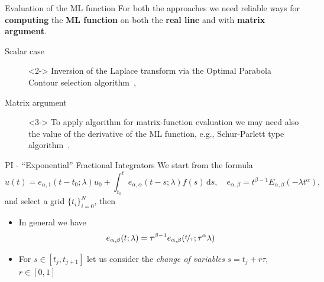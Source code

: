 \documentclass[aspectratio=169,xcolor=dvipsnames]{beamer}
\begin{document}
\begin{frame}{Evaluation of the ML function}
For both the approaches we need reliable ways for \textbf{computing} the \textbf{ML function} on both the \textbf{real line} and with \textbf{matrix argument}.  
\begin{description}
	\item[Scalar case]<2-> Inversion of the Laplace transform via the \alert{Optimal Parabola Contour} selection algorithm~\parencite{Garrappa},
	\item[Matrix argument]<3-> To apply algorithm for matrix-function evaluation we may need also the value of the derivative of the ML function, e.g., Schur-Parlett type algorithm~\parencite{MatrixML,HighamML}. 
\end{description}

\vfill


\end{frame}

\begin{frame}{PI - ``Exponential'' Fractional Integrators}
We start from the formula
\[
u(t) = e_{\alpha,1}(t-t_0;\lambda) u_0 + \int_{t_0}^{t} e_{\alpha,\alpha}(t-s;\lambda) f(s)\,\textrm{d}s, \quad e_{\alpha,\beta} = t^{\beta - 1} E_{\alpha,\beta}(-\lambda t^\alpha),
\]
and select a grid $\{t_i\}_{i=0}^{N}$, then
\begin{itemize}
	\item<2-> In general we have \[e_{\alpha,\beta}(t;\lambda) = \tau^{\beta-1} e_{\alpha,\beta}(\nicefrac{t}{\tau};\tau^\alpha \lambda)\]
	\item<3-> For $s \in [t_j,t_{j+1}]$ let us consider the \emph{change of variables} $s = t_j + r\tau$, $r \in [0,1]$ 
\end{itemize}
\end{frame}
\end{document}
